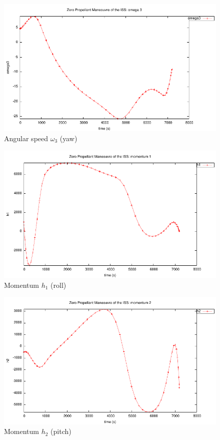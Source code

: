 \documentclass[a4paper,11pt]{report}    %
\begin{document}
\begin{figure}
  \centering
  \includegraphics{../examples/zpm/zpm_omega3}
  \caption{Angular speed $\omega_3$ (yaw)}
 \label{fig:zpm_omega3}
\end{figure}


\begin{figure}
  \centering
  \includegraphics{../examples/zpm/zpm_h1}
  \caption{Momentum $h_1$ (roll)}
 \label{fig:zpm_h1}
\end{figure}

\begin{figure}
  \centering
  \includegraphics{../examples/zpm/zpm_h2}
  \caption{Momentum $h_2$ (pitch)}
 \label{fig:zpm_h2}
\end{figure}
\end{document}
